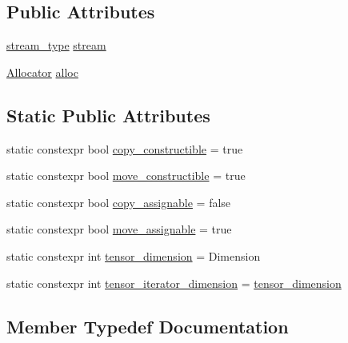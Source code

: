 \subsection*{Public Attributes}
\begin{DoxyCompactItemize}
\item 
\hyperlink{structBC_1_1tensors_1_1exprs_1_1Array__Const__View_a8bb694230cd6fd0ff0f5b5cbe667614a}{stream\+\_\+type} \hyperlink{structBC_1_1tensors_1_1exprs_1_1Array__Const__View_a563db6a19ab0dd981c3d2ecf976913ea}{stream}
\item 
\hyperlink{namespaceBC_a934f94b17b06290e6b241e5f59930c5f}{Allocator} \hyperlink{structBC_1_1tensors_1_1exprs_1_1Array__Const__View_a41840bc29472fdfe86ddbf6792a23e98}{alloc}
\end{DoxyCompactItemize}
\subsection*{Static Public Attributes}
\begin{DoxyCompactItemize}
\item 
static constexpr bool \hyperlink{structBC_1_1tensors_1_1exprs_1_1Array__Const__View_a5f5088e4a51d9fc5e0f9a8890719d789}{copy\+\_\+constructible} = true
\item 
static constexpr bool \hyperlink{structBC_1_1tensors_1_1exprs_1_1Array__Const__View_aad24a886f0d1cf6460591aef05e441b1}{move\+\_\+constructible} = true
\item 
static constexpr bool \hyperlink{structBC_1_1tensors_1_1exprs_1_1Array__Const__View_a157f189e9ed3cbe65a71ae2a7a0b1550}{copy\+\_\+assignable} = false
\item 
static constexpr bool \hyperlink{structBC_1_1tensors_1_1exprs_1_1Array__Const__View_a956fa29e4f433d9547c29cfbce39cf64}{move\+\_\+assignable} = true
\item 
static constexpr int \hyperlink{structBC_1_1tensors_1_1exprs_1_1Array__Const__View_a93f55387af07781120c38abbb7a89bfd}{tensor\+\_\+dimension} = Dimension
\item 
static constexpr int \hyperlink{structBC_1_1tensors_1_1exprs_1_1Array__Const__View_ac2bcaa8bbfbdfb0ae6d232f1b3fdb340}{tensor\+\_\+iterator\+\_\+dimension} = \hyperlink{structBC_1_1tensors_1_1exprs_1_1Array__Const__View_a93f55387af07781120c38abbb7a89bfd}{tensor\+\_\+dimension}
\end{DoxyCompactItemize}


\subsection{Member Typedef Documentation}
